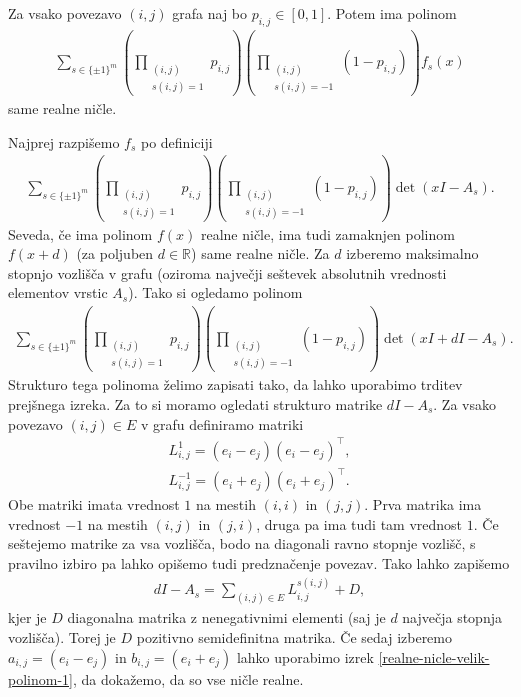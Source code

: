 \begin{izrek}\label{nicle-prepletenih-so-realne}
    Za vsako povezavo \((i,j)\) grafa naj bo \(p_{i,j}\in [0,1]\). Potem ima polinom
    \begin{align*}
        \sum_{s\in \{\pm 1\}^m} \left(\prod_{\substack{(i,j) \\s(i,j)=1}} p_{i,j}\right) \left(\prod_{\substack{(i,j)\\s(i,j)=-1}} (1- p_{i,j})\right) f_s(x)
    \end{align*}
    same realne ničle.
\end{izrek}
\begin{dokaz}
    Najprej razpišemo \(f_s\) po definiciji
    \begin{align*}
        \sum_{s\in \{\pm 1\}^m} \left(\prod_{\substack{(i,j) \\s(i,j)=1}} p_{i,j}\right) \left(\prod_{\substack{(i,j)\\s(i,j)=-1}} (1- p_{i,j})\right) \det(xI - A_s).
    \end{align*}
    Seveda, če ima polinom \(f(x)\) realne ničle, ima tudi zamaknjen polinom \(f(x+d)\) (za poljuben \(d\in \mathbb R\)) same realne ničle. Za \(d\) izberemo maksimalno stopnjo vozlišča v grafu (oziroma največji seštevek absolutnih vrednosti elementov vrstic \(A_s\)). Tako si ogledamo polinom
    \begin{align*}
        \sum_{s\in \{\pm 1\}^m} \left(\prod_{\substack{(i,j) \\s(i,j)=1}} p_{i,j}\right) \left(\prod_{\substack{(i,j)\\s(i,j)=-1}} (1- p_{i,j})\right) \det(xI + dI - A_s).
    \end{align*}
    Strukturo tega polinoma želimo zapisati tako, da lahko uporabimo trditev prejšnega izreka. Za to si moramo ogledati strukturo matrike \(dI - A_s\). Za vsako povezavo \((i,j)\in E\) v grafu definiramo matriki
    \begin{align*}
        L_{i,j}^1 = (e_i-e_j)(e_i-e_j)^\top, \\
        L_{i,j}^{-1} = (e_i+e_j)(e_i+e_j)^\top.
    \end{align*}
    Obe matriki imata vrednost \(1\) na mestih \((i,i)\) in \((j,j)\). Prva matrika ima vrednost \(-1\) na mestih \((i,j)\) in \((j,i)\), druga pa ima tudi tam vrednost \(1\). Če seštejemo matrike za vsa vozlišča, bodo na diagonali ravno stopnje vozlišč, s pravilno izbiro pa lahko opišemo tudi predznačenje povezav. Tako lahko zapišemo
    \begin{align*}
        dI - A_s = \sum_{(i,j)\in E} L_{i,j}^{s(i,j)} + D,
    \end{align*}
    kjer je \(D\) diagonalna matrika z nenegativnimi elementi (saj je \(d\) največja stopnja vozlišča). Torej je \(D\) pozitivno semidefinitna matrika. Če sedaj izberemo \(a_{i,j} = (e_i-e_j)\) in \(b_{i,j} = (e_i+e_j)\) lahko uporabimo izrek \ref{realne-nicle-velik-polinom-1}, da dokažemo, da so vse ničle realne.
\end{dokaz}

